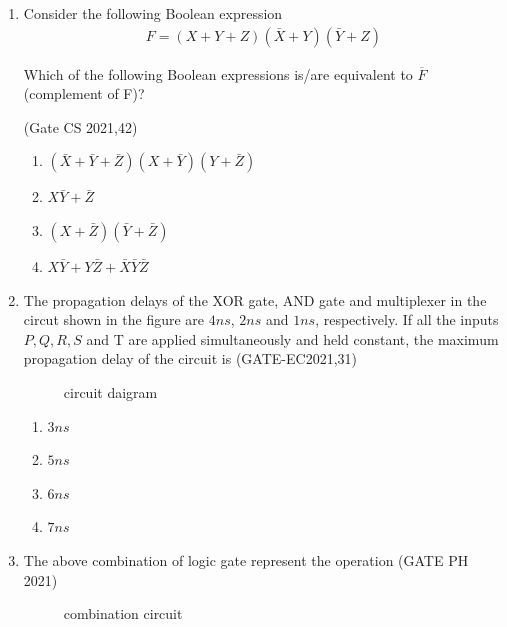 \begin{enumerate}
\item Consider the following Boolean expression 
\begin{align*} F = (X+Y+Z)(\bar{X}+Y)(\bar{Y}+Z) \end{align*}
       
Which of the following Boolean expressions is/are equivalent to $\overline{F}$ (complement of 
 F)?
 
\hfill{(Gate CS 2021,42)}
\begin{enumerate}                                     
\item $(\bar{X}+\bar{Y}+\bar{Z})(X+\bar{Y})(Y+\bar{Z})$
\item $X\bar{Y}+\bar{Z}$
\item $(X+\bar{Z})(\bar{Y}+\bar{Z})$
\item $X\bar{Y}+Y\bar{Z}+\bar{X}\bar{Y}\bar{Z}$ 
\end{enumerate}

    \item The propagation delays of the XOR gate, AND gate and multiplexer  in the circut shown in the figure are $4 ns$, $2 ns$ and $1 ns$, respectively.
    If all the inputs $P, Q, R, S$ and T are applied simultaneously and held constant, the maximum propagation delay of the circuit is
\hfill(GATE-EC2021,31)  

\begin{figure}[H]

\caption{circuit daigram} 
\label{fig:block_diagram}
\end{figure}
\begin{enumerate}

    \item $3 ns$
    \item $5 ns$
    \item $6 ns$
    \item $7 ns$
\end{enumerate}
\item  The above combination of logic gate represent the operation
 \hfill(GATE PH 2021)
	      \begin{figure}[H]
		      \centering
		      
	              \caption{combination circuit}
	      \end{figure}


\end{enumerate}
